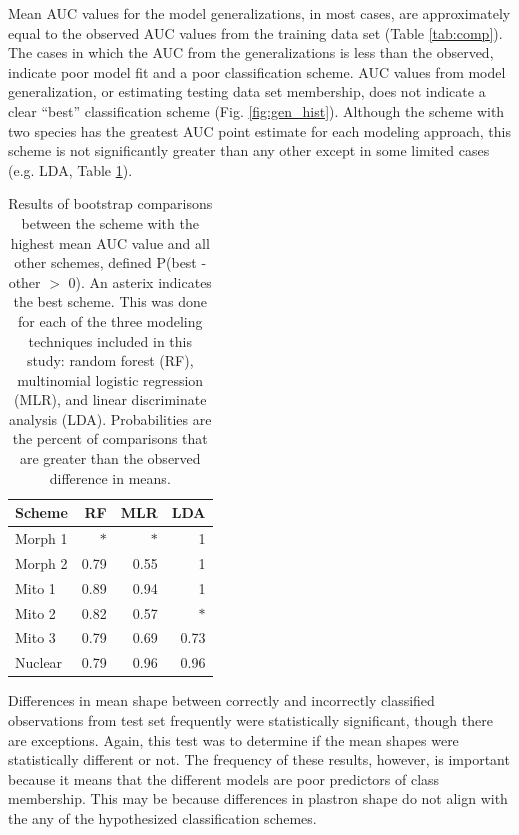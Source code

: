\documentclass[12pt,letterpaper]{article}
\begin{document}
Mean AUC values for the model generalizations, in most cases, are approximately equal to the observed AUC values from the training data set (Table \ref{tab:comp}). The  cases in which the AUC from the  generalizations is less than the observed, indicate poor model fit and a poor classification scheme. AUC values from model generalization, or estimating testing data set membership, does not indicate a clear ``best'' classification scheme (Fig. \ref{fig:gen_hist}). Although the scheme with two species has the greatest AUC point estimate for each modeling approach, this scheme is not significantly greater than any other except in some limited cases (e.g. LDA, Table \ref{tab:gen_tests}). 

\begin{table}[ht]
  \centering
  \caption{Results of bootstrap comparisons between the scheme with the highest mean AUC value and all other schemes, defined P(best - other \(>\) 0). An asterix indicates the best scheme. This was done for each of the three modeling techniques included in this study: random forest (RF), multinomial logistic regression (MLR), and linear discriminate analysis (LDA). Probabilities are the percent of comparisons that are greater than the observed difference in means.}
  \begin{tabular}{ l r r r }
    \hline
    Scheme & RF & MLR & LDA \\
    \hline
    \hline
    Morph 1 & \(\ast\) & \(\ast\) & 1 \\
    Morph 2 & 0.79 & 0.55 & 1 \\
    Mito 1 & 0.89 & 0.94 & 1 \\ 
    Mito 2 & 0.82 & 0.57 & \(\ast\) \\ 
    Mito 3 & 0.79 & 0.69 & 0.73 \\ 
    Nuclear & 0.79 & 0.96 & 0.96 \\ 
    \hline
  \end{tabular}
  \label{tab:gen_tests}
\end{table}

Differences in mean shape between correctly and incorrectly classified observations from test set frequently were statistically significant, though there are exceptions. Again, this test was to determine if the mean shapes were statistically different or not. The frequency of these results, however, is important because it means that the different models are poor predictors of class membership. This may be because differences in plastron shape do not align with the any of the hypothesized classification schemes.
\end{document}
